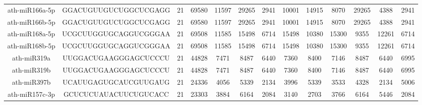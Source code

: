 \begin{landscape}
\begin{table}[]
\begin{tabular}{ccccccccccccc}
    ath-miR166a-5p   & GGACUGUUGUCUGGCUCGAGG    & 21           & 69580        & 11597            & 29265        & 2941                         & 10001                & 14915                & 8070                  & 29265                 & 4388                  & 2941                  \\
    ath-miR166b-5p   & GGACUGUUGUCUGGCUCGAGG    & 21           & 69580        & 11597            & 29265        & 2941                         & 10001                & 14915                & 8070                  & 29265                 & 4388                  & 2941                  \\
    ath-miR168a-5p   & UCGCUUGGUGCAGGUCGGGAA    & 21           & 69508        & 11585            & 15498        & 6714                         & 15498                & 10380                & 15300                 & 9355                  & 12261                 & 6714                  \\
    ath-miR168b-5p   & UCGCUUGGUGCAGGUCGGGAA    & 21           & 69508        & 11585            & 15498        & 6714                         & 15498                & 10380                & 15300                 & 9355                  & 12261                 & 6714                  \\
    ath-miR319a      & UUGGACUGAAGGGAGCUCCCU    & 21           & 44828        & 7471             & 8487         & 6440                         & 7360                 & 8400                 & 7146                  & 8487                  & 6440                  & 6995                  \\
    ath-miR319b      & UUGGACUGAAGGGAGCUCCCU    & 21           & 44828        & 7471             & 8487         & 6440                         & 7360                 & 8400                 & 7146                  & 8487                  & 6440                  & 6995                  \\
    ath-miR397b      & UCAUUGAGUGCAUCGUUGAUG    & 21           & 24336        & 4056             & 5339         & 2134                         & 3996                 & 5339                 & 3533                  & 4328                  & 2134                  & 5006                  \\
    ath-miR157c-3p   & GCUCUCUAUACUUCUGUCACC    & 21           & 23303        & 3884             & 6164         & 2084                         & 3140                 & 2703                 & 3766                  & 6164                  & 5446                  & 2084                  \\

\end{tabular}
\end{table}
\end{landscape}
